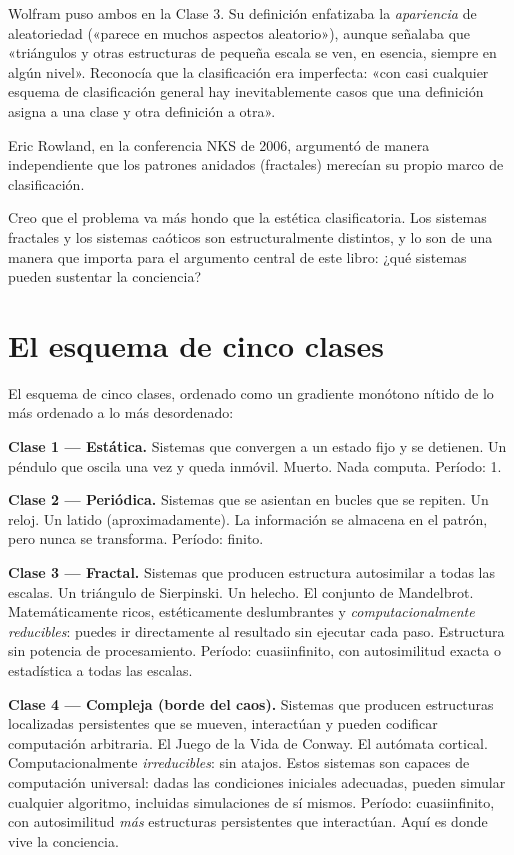 \documentclass[11pt, twoside, openright]{book}
\begin{document}
Wolfram puso ambos en la Clase 3. Su definición enfatizaba la \textit{apariencia} de aleatoriedad («parece en muchos aspectos aleatorio»), aunque señalaba que «triángulos y otras estructuras de pequeña escala se ven, en esencia, siempre en algún nivel». Reconocía que la clasificación era imperfecta: «con casi cualquier esquema de clasificación general hay inevitablemente casos que una definición asigna a una clase y otra definición a otra».

Eric Rowland, en la conferencia NKS de 2006, argumentó de manera independiente que los patrones anidados (fractales) merecían su propio marco de clasificación.

Creo que el problema va más hondo que la estética clasificatoria. Los sistemas fractales y los sistemas caóticos son estructuralmente distintos, y lo son de una manera que importa para el argumento central de este libro: ¿qué sistemas pueden sustentar la conciencia?

\section*{El esquema de cinco clases}

El esquema de cinco clases, ordenado como un gradiente monótono nítido de lo más ordenado a lo más desordenado:

\textbf{Clase 1 --- Estática.} Sistemas que convergen a un estado fijo y se detienen. Un péndulo que oscila una vez y queda inmóvil. Muerto. Nada computa. Período: 1.

\textbf{Clase 2 --- Periódica.} Sistemas que se asientan en bucles que se repiten. Un reloj. Un latido (aproximadamente). La información se almacena en el patrón, pero nunca se transforma. Período: finito.

\textbf{Clase 3 --- Fractal.} Sistemas que producen estructura autosimilar a todas las escalas. Un triángulo de Sierpinski. Un helecho. El conjunto de Mandelbrot. Matemáticamente ricos, estéticamente deslumbrantes y \textit{computacionalmente reducibles}: puedes ir directamente al resultado sin ejecutar cada paso. Estructura sin potencia de procesamiento. Período: cuasiinfinito, con autosimilitud exacta o estadística a todas las escalas.

\textbf{Clase 4 --- Compleja (borde del caos).} Sistemas que producen estructuras localizadas persistentes que se mueven, interactúan y pueden codificar computación arbitraria. El Juego de la Vida de Conway. El autómata cortical. Computacionalmente \textit{irreducibles}: sin atajos. Estos sistemas son capaces de computación universal: dadas las condiciones iniciales adecuadas, pueden simular cualquier algoritmo, incluidas simulaciones de sí mismos. Período: cuasiinfinito, con autosimilitud \textit{más} estructuras persistentes que interactúan. Aquí es donde vive la conciencia.
\end{document}
